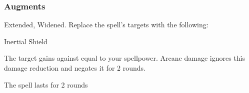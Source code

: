 \subsubsection{Augments}
 Extended, Widened.
Replace
the spell's targets with the following:
\begin{augmenttargetinginfo}
\end{augmenttargetinginfo}
\begin{spellsection}{Inertial Shield}
\begin{spellheader}
\end{spellheader}
\begin{spellcontent}
\begin{spelltargetinginfo}
\end{spelltargetinginfo}
\begin{spelleffects}
\spelleffect The target gains  against  equal to your spellpower.
Arcane damage ignores this damage reduction and negates it for 2 rounds.
\spelldur \durshort
\end{spelleffects}
\end{spellcontent}
\begin{spellfooter}
\miscastexplode
\end{spellfooter}
\begin{spellcantrip}
The spell lasts for 2 rounds
\end{spellcantrip}
\end{spellsection}
